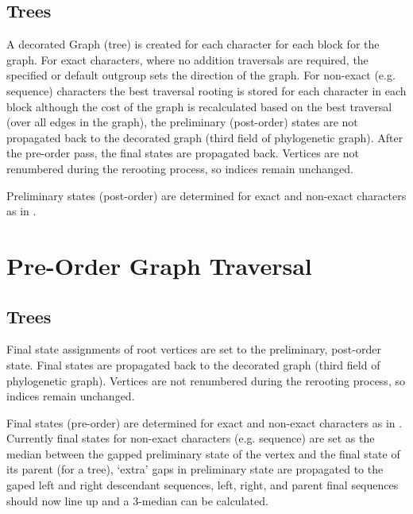 \documentclass[11pt]{article}
\begin{document}
		\subsection{Trees}
		A decorated Graph (tree) is created for each character for each block for the graph.  For exact characters, where no addition traversals are required, 
		the specified or default
		outgroup sets the direction of the graph.  For non-exact (e.g. sequence) characters the best traversal rooting is stored for each character in each block
		although the cost of the graph is recalculated based on the best traversal (over all edges in the graph), the preliminary (post-order) states are not propagated back
		to the decorated graph (third field of phylogenetic graph).  After the pre-order pass, the final states are propagated back.
		Vertices are not renumbered during the rerooting process, so indices remain unchanged.
		
			Preliminary states (post-order) are determined for exact and non-exact characters as in \cite{Wheeler2012}.
	
	\section{Pre-Order Graph Traversal}
		\subsection{Trees}
		Final state assignments of root vertices are set to the preliminary, post-order state.
		Final  states are propagated back to the decorated graph (third field of phylogenetic graph).
		Vertices are not renumbered during the rerooting process, so indices remain unchanged.
		
		Final states (pre-order) are determined for exact and non-exact characters as in \cite{Wheeler2012}.  Currently final states for 
		non-exact characters (e.g. sequence) are set as the median between the gapped preliminary state of the vertex and the final state of its parent
		(for a tree), `extra' gaps in preliminary state are propagated to the gaped left and right descendant sequences, left, right, and parent final sequences
		should now line up and a 3-median can be calculated.
		
\end{document}
